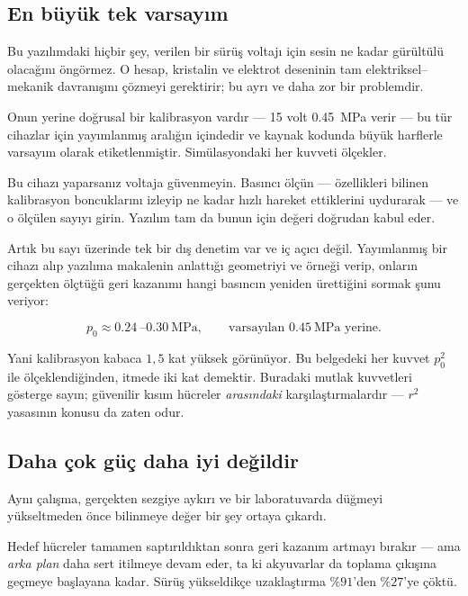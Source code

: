\documentclass[11pt,a4paper]{article}
\begin{document}
\subsection*{En büyük tek varsayım}

Bu yazılımdaki hiçbir şey, verilen bir sürüş voltajı için sesin ne kadar
gürültülü olacağını öngörmez. O hesap, kristalin ve elektrot deseninin tam
elektriksel--mekanik davranışını çözmeyi gerektirir; bu ayrı ve daha zor bir
problemdir.

Onun yerine doğrusal bir kalibrasyon vardır --- 15 volt \SI{0,45}{\mega\pascal}
verir --- bu tür cihazlar için yayımlanmış aralığın içindedir ve kaynak kodunda
büyük harflerle varsayım olarak etiketlenmiştir. Simülasyondaki her kuvveti
ölçekler.

\begin{plain}
Bu cihazı yaparsanız voltaja güvenmeyin. Basıncı ölçün --- özellikleri bilinen
kalibrasyon boncuklarını izleyip ne kadar hızlı hareket ettiklerini uydurarak ---
ve o ölçülen sayıyı girin. Yazılım tam da bunun için değeri doğrudan kabul eder.
\end{plain}

Artık bu sayı üzerinde tek bir dış denetim var ve iç açıcı değil. Yayımlanmış bir
cihazı alıp yazılıma makalenin anlattığı geometriyi ve örneği verip, onların
gerçekten ölçtüğü geri kazanımı hangi basıncın yeniden ürettiğini sormak şunu
veriyor:

\begin{equation*}
p_0 \approx \SI{0,24}{}\text{--}\SI{0,30}{\mega\pascal},
\qquad\text{varsayılan } \SI{0,45}{\mega\pascal}\text{ yerine.}
\end{equation*}

Yani kalibrasyon kabaca $1,5$ kat yüksek görünüyor. Bu belgedeki her kuvvet
$p_0^2$ ile ölçeklendiğinden, itmede iki kat demektir. Buradaki mutlak kuvvetleri
gösterge sayın; güvenilir kısım hücreler \emph{arasındaki} karşılaştırmalardır ---
$r^2$ yasasının konusu da zaten odur.

\subsection*{Daha çok güç daha iyi değildir}

Aynı çalışma, gerçekten sezgiye aykırı ve bir laboratuvarda düğmeyi yükseltmeden
önce bilinmeye değer bir şey ortaya çıkardı.

Hedef hücreler tamamen saptırıldıktan sonra geri kazanım artmayı bırakır --- ama
\emph{arka plan} daha sert itilmeye devam eder, ta ki akyuvarlar da toplama
çıkışına geçmeye başlayana kadar. Sürüş yükseldikçe uzaklaştırma $\%91$'den
$\%27$'ye çöktü.
\end{document}
